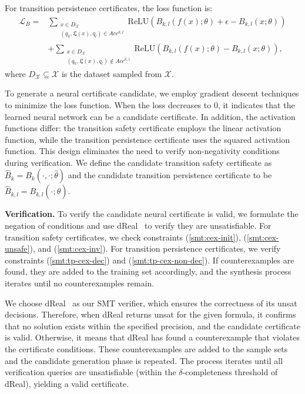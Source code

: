 For transition persistence certificates, the loss function is:
\begin{align}
\mathcal{L}_B = &\sum_{\substack{x \in D_{\mathcal{X}} \\ (q_k, \mathfrak{L}(x), q_l) \in Acc^{k,l}}} \text{ReLU}(B_{k,l}(f(x); \theta) + \epsilon - B_{k,l}(x; \theta)) \\
&+ \sum_{\substack{x \in D_{\mathcal{X}} \\ (q_k, \mathfrak{L}(x), q_l) \not\in Acc^{k,l}}} \text{ReLU}(B_{k,l}(f(x); \theta) - B_{k,l}(x; \theta)),
\end{align}
where $D_{\mathcal{X}} \subseteq \mathcal{X}$ is the dataset sampled from $\mathcal{X}$.

To generate a neural certificate candidate, we employ gradient descent techniques to minimize the loss function. When the loss decreases to 0, it indicates that the learned neural network can be a candidate certificate. In addition, the activation functions differ: the transition safety certificate employs the linear activation function, while the transition persistence certificate uses the squared activation function. This design eliminates the need to verify non-negativity conditions during verification. We define the candidate transition safety certificate as $\hat{B}_{k} = B_{k}(\cdot, \cdot; \hat{\theta})$ and the candidate transition persistence certificate to be $\hat{B}_{k,l} = B_{k,l}(\cdot; \hat{\theta})$.

\textbf{Verification.} To verify the candidate neural certificate is valid, we formulate the negation of conditions and use dReal~\cite{gao2013dreal} to verify they are unsatisfiable. For transition safety certificates, we check constraints (\ref{smt:cex-init}), (\ref{smt:cex-unsafe}), and (\ref{smt:cex-inv}). For transition persistence certificates, we verify constraints (\ref{smt:tp-cex-dec}) and (\ref{smt:tp-cex-non-dec}). If counterexamples are found, they are added to the training set accordingly, and the synthesis process iterates until no counterexamples remain.

We choose dReal~\cite{gao2013dreal} as our SMT verifier, which ensures the correctness of its unsat decisions. Therefore, when dReal returns unsat for the given formula, it confirms that no solution exists within the specified precision, and the candidate certificate is valid. Otherwise, it means that dReal has found a counterexample that violates the certificate conditions. These counterexamples are added to the sample sets and the candidate generation phase is repeated. The process iterates until all verification queries are unsatisfiable (within the $\delta$-completeness threshold of dReal), yielding a valid certificate.

